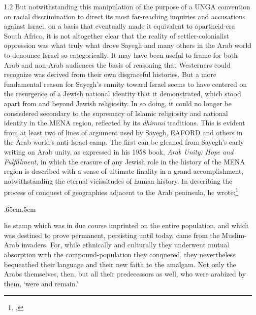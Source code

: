 \documentclass[../unravbook.tex]{subfiles}
\begin{document}
\begin{spacing}{1.2}
But notwithstanding this manipulation of the purpose of a UNGA convention on racial discrimination to direct its most far-reaching inquiries and accusations against Israel, on a basis that eventually made it equivalent to apartheid-era South Africa, it is not altogether clear that the reality of settler-colonialist oppression was what truly what drove Sayegh and many others in the Arab world to denounce Israel so categorically. It may have been useful to frame for both Arab and non-Arab audiences the basis of reasoning that Westerners could recognize was derived from their own disgraceful histories. But a more fundamental reason for Sayegh's enmity toward Israel seems to have centered on the resurgence of a Jewish national identity that it demonstrated, which stood apart from and beyond Jewish religiosity. In so doing, it could no longer be consisdered secondary to the supremacy of Islamic religiosity and national identity in the MENA region, reflected by its \textit{dhimmi} traditions. This is evident from at least two of lines of argument used by Sayegh, EAFORD and others in the Arab world's  anti-Israel camp. The first can be gleaned from Sayegh's early writing on Arab unity, as expressed in his 1958 book, \textit{Arab Unity: Hope and Fulfillment,} in which the erasure of any Jewish role in the history of the MENA region is described with a sense of ultimate finality in a grand accomplishment, notwithstanding the eternal vicissitudes of human history. In describing the process of conquest of geographies adjacent to the Arab peninsula, he wrote:\footcite[16]{Sayegh-1958a}

\begin{adjustwidth}{.65cm}{.5cm}
    \begin{singlespace}
    [T]he stamp which was in due course imprinted on the entire population, and which was destined to prove permanent, persisting until today, came from the Muslim-Arab invaders. For, while ethnically and culturally they underwent mutual absorption with the compound-population they conquered, they nevertheless bequeathed their language and their new faith to the amalgam. Not only the Arabs themselves, then, but all their predecessors as well, who were arabized by them, `were and remain.'
    \end{singlespace}
\end{adjustwidth}


\end{spacing}
\end{document}
